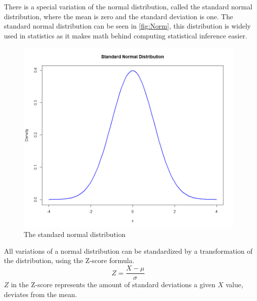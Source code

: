 There is a special variation of the normal distribution, called the standard normal distribution, where the mean is zero and the standard deviation is one. The standard normal distribution can be seen in \autoref{fig:Norm}, this distribution is widely used in statistics as it makes math behind computing statistical inference easier.
\begin{figure}[h!]
	\centering
	\begin{minipage}{0.80\textwidth}
		\centering
		\includegraphics[width=\linewidth]{billder/Normal distribution.png}
		\caption{The standard normal distribution}
		\label{fig:Norm}
	\end{minipage}\hfill
\end{figure}
All variations of a normal distribution can be standardized by a transformation of the distribution, using the Z-score formula.
\newline
$$Z=\frac{X-\mu}{\sigma}$$
\newline
$Z$ in the Z-score represents the amount of standard deviations a given $X$ value, deviates from the mean.

